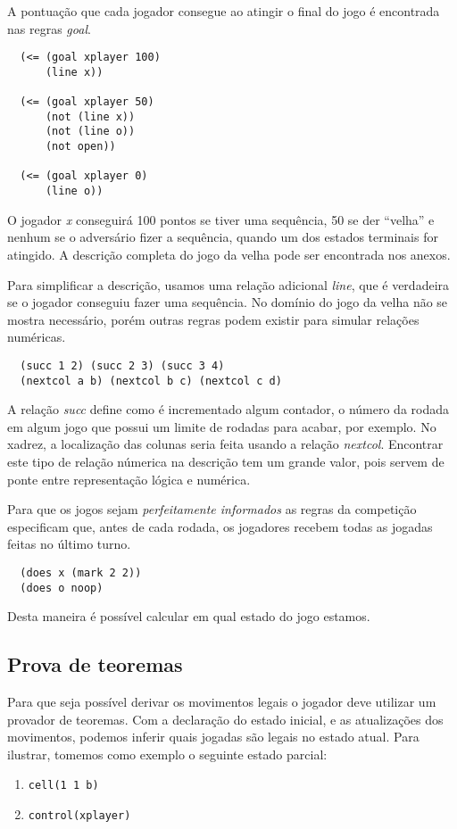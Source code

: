 A pontuação que cada jogador consegue ao atingir o final do jogo é encontrada
nas regras {\it goal}.
\begin{verbatim}
  (<= (goal xplayer 100)
      (line x))
 
  (<= (goal xplayer 50)
      (not (line x))
      (not (line o))
      (not open))
 
  (<= (goal xplayer 0)
      (line o))
\end{verbatim}
O jogador {\it x} conseguirá 100 pontos se tiver uma sequência, 50 se der
``velha'' e nenhum se o adversário fizer a sequência, quando um dos estados
terminais for atingido. A descrição completa do jogo da velha pode ser
encontrada nos anexos.

Para simplificar a descrição, usamos uma relação adicional {\it line}, que é
verdadeira se o jogador conseguiu fazer uma sequência. No domínio do jogo da
velha não se mostra necessário, porém outras regras podem existir para simular
relações numéricas.
\begin{verbatim}
  (succ 1 2) (succ 2 3) (succ 3 4)
  (nextcol a b) (nextcol b c) (nextcol c d)
\end{verbatim}
A relação {\it succ} define como é incrementado algum contador, o número da
rodada em algum jogo que possui um limite de rodadas para acabar, por
exemplo. No xadrez, a localização das colunas seria feita usando a relação {\it
  nextcol}. Encontrar este tipo de relação númerica na descrição tem um grande 
valor, pois servem de ponte entre representação lógica e numérica.


Para que os jogos sejam {\it perfeitamente informados} as regras da competição
especificam que, antes de cada rodada, os jogadores recebem todas as jogadas
feitas no último turno.
\begin{verbatim}
  (does x (mark 2 2))
  (does o noop)
\end{verbatim}
Desta maneira é possível calcular em qual estado do jogo estamos.

\subsection{Prova de teoremas}
Para que seja possível derivar os movimentos legais o jogador deve utilizar um
provador de teoremas. Com a declaração do estado inicial, e as atualizações dos
movimentos, podemos inferir quais jogadas são legais no estado atual. Para
ilustrar, tomemos como exemplo o seguinte estado parcial:
\begin{enumerate}
  \item \verb|cell(1 1 b)|
  \item \verb|control(xplayer)|
\end{enumerate}


